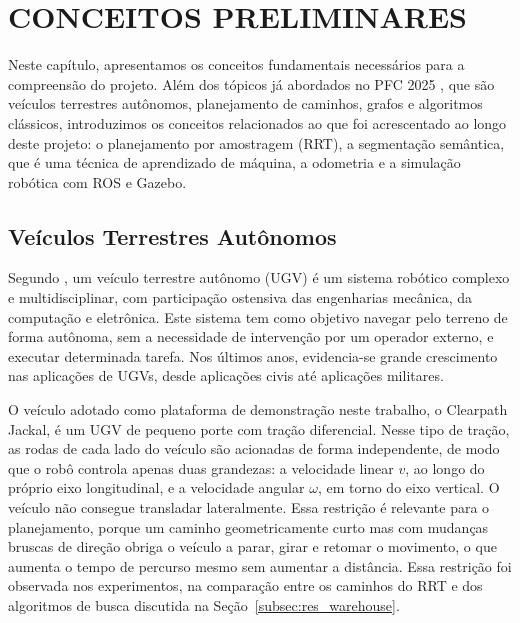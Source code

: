 \documentclass[
    12pt,
    openright,
    oneside,
    a4paper,
    english,
    brazil
]{abntex2}
\begin{document}
\chapter{CONCEITOS PRELIMINARES}

Neste capítulo, apresentamos os conceitos fundamentais necessários para a compreensão do projeto. Além dos tópicos já abordados no PFC 2025 \cite{camelo2025}, que são veículos terrestres autônomos, planejamento de caminhos, grafos e algoritmos clássicos, introduzimos os conceitos relacionados ao que foi acrescentado ao longo deste projeto: o planejamento por amostragem (RRT), a segmentação semântica, que é uma técnica de aprendizado de máquina, a odometria e a simulação robótica com ROS e Gazebo.

\section{Veículos Terrestres Autônomos}

Segundo \cite{finn2010}, um veículo terrestre autônomo (UGV) é um sistema robótico complexo e multidisciplinar, com participação ostensiva das engenharias mecânica, da computação e eletrônica. Este sistema tem como objetivo navegar pelo terreno de forma autônoma, sem a necessidade de intervenção por um operador externo, e executar determinada tarefa. Nos últimos anos, evidencia-se grande crescimento nas aplicações de UGVs, desde aplicações civis até aplicações militares.

O veículo adotado como plataforma de demonstração neste trabalho, o Clearpath Jackal, é um UGV de pequeno porte com tração diferencial. Nesse tipo de tração, as rodas de cada lado do veículo são acionadas de forma independente, de modo que o robô controla apenas duas grandezas: a velocidade linear $v$, ao longo do próprio eixo longitudinal, e a velocidade angular $\omega$, em torno do eixo vertical. O veículo não consegue transladar lateralmente. Essa restrição é relevante para o planejamento, porque um caminho geometricamente curto mas com mudanças bruscas de direção obriga o veículo a parar, girar e retomar o movimento, o que aumenta o tempo de percurso mesmo sem aumentar a distância. Essa restrição foi observada nos experimentos, na comparação entre os caminhos do RRT e dos algoritmos de busca discutida na Seção~\ref{subsec:res_warehouse}.
\end{document}
